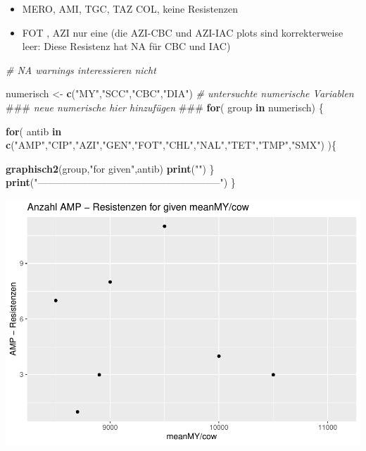 \documentclass[
]{article}
\newenvironment{Shaded}{\begin{snugshade}}{\end{snugshade}}
\newcommand{\AlertTok}[1]{\textcolor[rgb]{0.94,0.16,0.16}{#1}}
\newcommand{\CommentTok}[1]{\textcolor[rgb]{0.56,0.35,0.01}{\textit{#1}}}
\newcommand{\ControlFlowTok}[1]{\textcolor[rgb]{0.13,0.29,0.53}{\textbf{#1}}}
\newcommand{\KeywordTok}[1]{\textcolor[rgb]{0.13,0.29,0.53}{\textbf{#1}}}
\newcommand{\NormalTok}[1]{#1}
\newcommand{\StringTok}[1]{\textcolor[rgb]{0.31,0.60,0.02}{#1}}
\providecommand{\tightlist}{%
  \setlength{\itemsep}{0pt}\setlength{\parskip}{0pt}}
\begin{document}
\begin{itemize}
\tightlist
\item
  MERO, AMI, TGC, TAZ COL, keine Resistenzen
\item
  FOT , AZI nur eine (die AZI-CBC und AZI-IAC plots sind korrekterweise
  leer: Diese Resistenz hat NA für CBC und IAC)
\end{itemize}

\begin{Shaded}
\begin{Highlighting}[]
\CommentTok{#   NA warnings interessieren nicht}
 
\NormalTok{numerisch <-}\StringTok{ }\KeywordTok{c}\NormalTok{(}\StringTok{"MY"}\NormalTok{,}\StringTok{"SCC"}\NormalTok{,}\StringTok{"CBC"}\NormalTok{,}\StringTok{"DIA"}\NormalTok{)     }\CommentTok{# untersuchte numerische Variablen  }\AlertTok{###}\CommentTok{ neue numerische hier hinzufügen }\AlertTok{###}
\ControlFlowTok{for}\NormalTok{( group }\ControlFlowTok{in}\NormalTok{ numerisch) \{   }

  \ControlFlowTok{for}\NormalTok{( antib }\ControlFlowTok{in} \KeywordTok{c}\NormalTok{(}\StringTok{"AMP"}\NormalTok{,}\StringTok{"CIP"}\NormalTok{,}\StringTok{"AZI"}\NormalTok{,}\StringTok{"GEN"}\NormalTok{,}\StringTok{"FOT"}\NormalTok{,}\StringTok{"CHL"}\NormalTok{,}\StringTok{"NAL"}\NormalTok{,}\StringTok{"TET"}\NormalTok{,}\StringTok{"TMP"}\NormalTok{,}\StringTok{"SMX"}\NormalTok{) )\{ }
  
    \KeywordTok{graphisch2}\NormalTok{(group,}\StringTok{"for given"}\NormalTok{,antib)  }
    \KeywordTok{print}\NormalTok{(}\StringTok{""}\NormalTok{)}
\NormalTok{  \} }
  \KeywordTok{print}\NormalTok{(}\StringTok{"--------------------------------------------------------"}\NormalTok{)}
\NormalTok{\}}
\end{Highlighting}
\end{Shaded}

\includegraphics{NResistenzen_files/figure-latex/numerical_variables-1.pdf}
\end{document}
